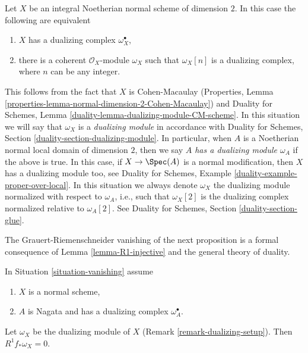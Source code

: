 \begin{remark}
\label{remark-dualizing-setup}
Let $X$ be an integral Noetherian normal scheme of dimension $2$.
In this case the following are equivalent
\begin{enumerate}
\item $X$ has a dualizing complex $\omega_X^\bullet$,
\item there is a coherent $\mathcal{O}_X$-module $\omega_X$ such that
$\omega_X[n]$ is a dualizing complex, where $n$ can be any integer.
\end{enumerate}
This follows from the fact that $X$ is Cohen-Macaulay
(Properties, Lemma \ref{properties-lemma-normal-dimension-2-Cohen-Macaulay}) and
Duality for Schemes, Lemma \ref{duality-lemma-dualizing-module-CM-scheme}.
In this situation we will say that $\omega_X$ is a {\it dualizing module}
in accordance with
Duality for Schemes, Section \ref{duality-section-dualizing-module}.
In particular, when $A$ is a Noetherian normal local domain of dimension
$2$, then we say {\it $A$ has a dualizing module $\omega_A$}
if the above is true. In this case, if $X \to \Spec(A)$ is a normal
modification, then $X$ has a dualizing module too, see
Duality for Schemes, Example \ref{duality-example-proper-over-local}.
In this situation we always denote $\omega_X$ the dualizing
module normalized with respect to $\omega_A$, i.e., such that
$\omega_X[2]$ is the dualizing complex normalized relative to
$\omega_A[2]$. See Duality for Schemes, Section \ref{duality-section-glue}.
\end{remark}

\noindent
The Grauert-Riemenschneider vanishing of the next proposition is a formal
consequence of Lemma \ref{lemma-R1-injective} and the general theory of
duality.

\begin{proposition}
\label{proposition-Grauert-Riemenschneider}
In Situation \ref{situation-vanishing} assume
\begin{enumerate}
\item $X$ is a normal scheme,
\item $A$ is Nagata and has a dualizing complex $\omega_A^\bullet$.
\end{enumerate}
Let $\omega_X$ be the dualizing module of $X$
(Remark \ref{remark-dualizing-setup}). Then $R^1f_*\omega_X = 0$.
\end{proposition}


